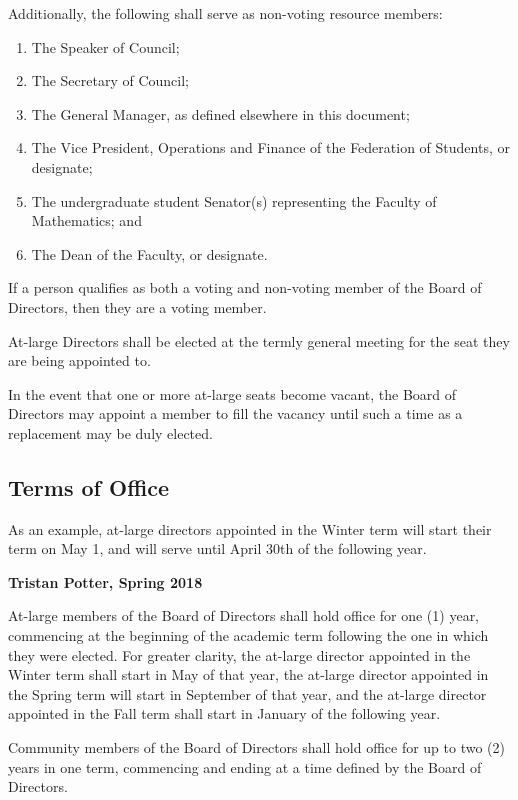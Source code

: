 \noindent Additionally, the following shall serve as non-voting resource
members:
\begin{enumerate}
  \item The Speaker of Council;
  \item The Secretary of Council;
  \item The General Manager, as defined elsewhere in this document;
  \item The Vice President, Operations and Finance of the Federation of
      Students, or designate;
  \item The undergraduate student Senator(s) representing the Faculty of
      Mathematics; and
  \item The Dean of the Faculty, or designate.
\end{enumerate}

If a person qualifies as both a voting and non-voting member of the Board of 
Directors, then they are a voting member.

At-large Directors shall be elected at the termly general meeting for the
seat they are being appointed to.

In the event that one or more at-large seats become vacant, the Board of
Directors may appoint a member to fill the vacancy until such a time as a
replacement may be duly elected.

\subsection{Terms of Office}
\begin{annotation}
    As an example, at-large directors appointed in the Winter term will start
    their term on May 1, and will serve until April 30th of the following year.

    \textbf{Tristan Potter, Spring 2018}
\end{annotation}
At-large members of the Board of Directors shall hold office for one (1) year,
commencing at the beginning of the academic term following the one in which
they were elected. For greater clarity, the at-large director appointed in
the Winter term shall start in May of that year, the at-large director 
appointed in the Spring term will start in September of that year, and the
at-large director appointed in the Fall term shall start in January of the 
following year. 

Community members of the Board of Directors shall hold office for up to two (2)
years in one term, commencing and ending at a time defined by the Board of
Directors.

